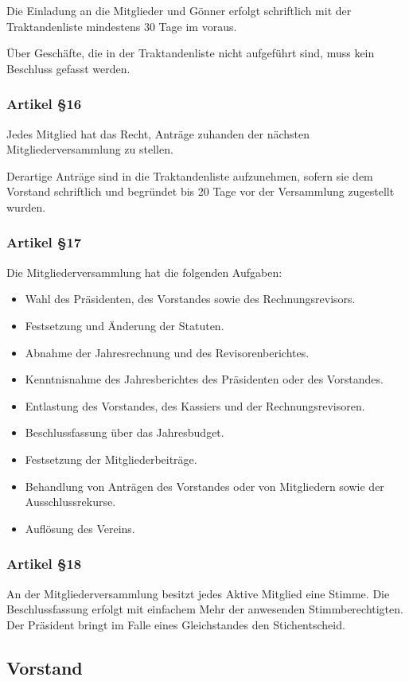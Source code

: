\documentclass[a4paper,
               10pt,
               fleqn]{article}
\begin{document}
Die Einladung an die Mitglieder und Gönner erfolgt 
schriftlich mit der Traktandenliste mindestens 30 Tage im
voraus.

Über Geschäfte, die in der Traktandenliste nicht aufgeführt 
sind, muss kein Beschluss gefasst werden.

\subsubsection*{Artikel §16}
Jedes Mitglied hat das Recht, Anträge zuhanden der nächsten 
Mitgliederversammlung zu stellen.

Derartige Anträge sind in die Traktandenliste aufzunehmen, 
sofern sie dem Vorstand schriftlich und begründet bis 20
Tage vor der Versammlung zugestellt wurden.

\newpage
\subsubsection*{Artikel §17}
Die Mitgliederversammlung hat die folgenden Aufgaben:
\begin{itemize}
\item Wahl des Präsidenten, des Vorstandes sowie des 
Rechnungsrevisors.
\item Festsetzung und Änderung der Statuten.
\item Abnahme der Jahresrechnung und des Revisorenberichtes.
\item Kenntnisnahme des Jahresberichtes des Präsidenten 
oder des Vorstandes.
\item Entlastung des Vorstandes, des Kassiers und der 
Rechnungsrevisoren.
\item Beschlussfassung über das Jahresbudget.
\item Festsetzung der Mitgliederbeiträge.
\item Behandlung von Anträgen des Vorstandes oder von 
Mitgliedern sowie der Ausschlussrekurse.
\item Auflösung des Vereins.
\end{itemize}

\subsubsection*{Artikel §18}
An der Mitgliederversammlung besitzt jedes Aktive Mitglied 
eine Stimme. Die Beschlussfassung erfolgt mit einfachem Mehr
der anwesenden Stimmberechtigten. 
Der Präsident bringt im Falle eines Gleichstandes den 
Stichentscheid.

\subsection{Vorstand}
\end{document}
